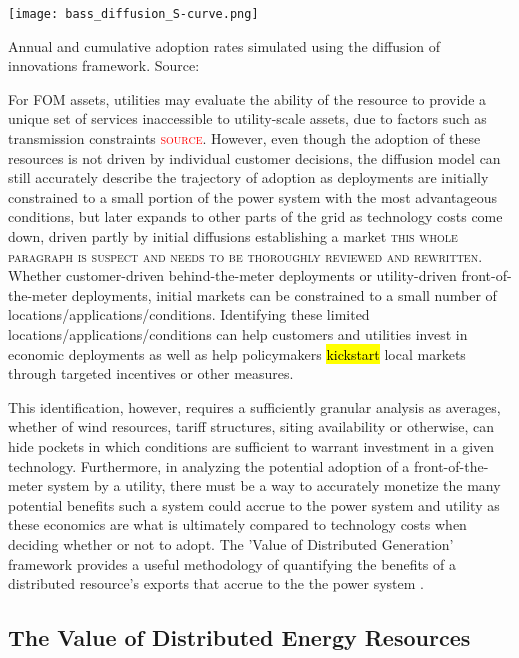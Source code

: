 \begin{conditionalfigure}[!htb]
  \centering
	  \texttt{[image: bass\_diffusion\_S-curve.png]}
	  \caption{Annual and cumulative adoption rates simulated using the diffusion of innovations framework. Source: \citet{sigrin_distributed_2016}}
	  \label{fig:bassscurve}
\end{conditionalfigure}

For FOM assets, utilities may evaluate the ability of the resource to provide a unique set of services inaccessible to utility-scale assets, due to factors such as transmission constraints \textcolor{red}{\textsc{source}}. However, even though the adoption of these resources is not driven by individual customer decisions, the diffusion model can still accurately describe the trajectory of adoption as deployments are initially constrained to a small portion of the power system with the most advantageous conditions, but later expands to other parts of the grid as technology costs come down, driven partly by initial diffusions establishing a market \textsc{this whole paragraph is suspect and needs to be thoroughly reviewed and rewritten}. Whether customer-driven behind-the-meter deployments or utility-driven front-of-the-meter deployments, initial markets can be constrained to a small number of locations/applications/conditions. Identifying these limited locations/applications/conditions can help customers and utilities invest in economic deployments as well as help policymakers \hl{kickstart} local markets through targeted incentives or other measures. 

This identification, however, requires a sufficiently granular analysis as averages, whether of wind resources, tariff structures, siting availability or otherwise, can hide pockets in which conditions are sufficient to warrant investment in a given technology. Furthermore, in analyzing the potential adoption of a front-of-the-meter system by a utility, there must be a way to accurately monetize the many potential benefits such a system could accrue to the power system and utility as these economics are what is ultimately compared to technology costs when deciding whether or not to adopt. The 'Value of Distributed Generation' framework provides a useful methodology of quantifying the benefits of a distributed resource's exports that accrue to the the power system \cite{denholm_methods_2014}.

\subsection{The Value of Distributed Energy Resources}
\label{intro_vder}

